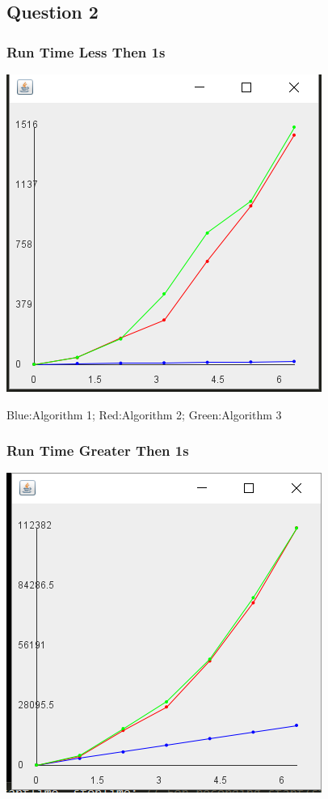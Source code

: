 \documentclass[11pt]{article} %
\begin{document}
\subsection{Question 2}


\subsubsection{Run Time Less Then 1s}
\includegraphics{under1K}

Blue:Algorithm 1; Red:Algorithm 2; Green:Algorithm 3

\subsubsection{Run Time Greater Then 1s}
\includegraphics{Over1K}
\end{document}
